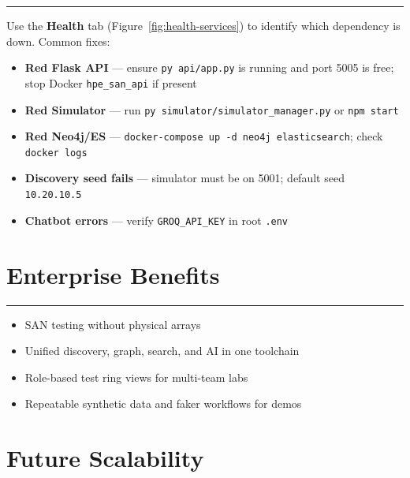 \documentclass[11pt,a4paper]{article}
\begin{document}
\vspace{0.3cm}\hrule\vspace{0.6cm}

Use the \textbf{Health} tab (Figure~\ref{fig:health-services}) to identify which dependency is down. Common fixes:

\begin{itemize}[leftmargin=1.5cm]
    \item \textbf{Red Flask API} --- ensure \texttt{py api/app.py} is running and port 5005 is free; stop Docker \texttt{hpe\_san\_api} if present
    \item \textbf{Red Simulator} --- run \texttt{py simulator/simulator\_manager.py} or \texttt{npm start}
    \item \textbf{Red Neo4j/ES} --- \texttt{docker-compose up -d neo4j elasticsearch}; check \texttt{docker logs}
    \item \textbf{Discovery seed fails} --- simulator must be on 5001; default seed \texttt{10.20.10.5}
    \item \textbf{Chatbot errors} --- verify \texttt{GROQ\_API\_KEY} in root \texttt{.env}
\end{itemize}


\section{Enterprise Benefits}

\vspace{0.3cm}\hrule\vspace{0.6cm}

\begin{itemize}[leftmargin=1.5cm]
    \item SAN testing without physical arrays
    \item Unified discovery, graph, search, and AI in one toolchain
    \item Role-based test ring views for multi-team labs
    \item Repeatable synthetic data and faker workflows for demos
\end{itemize}

\section{Future Scalability}
\end{document}
